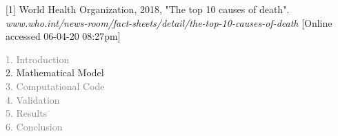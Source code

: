 \begin{frame}
\vspace{0.2cm}
\tiny [1] World Health Organization, 2018, "The top 10 causes of death".
\textit{www.who.int/news-room/fact-sheets/detail/the-top-10-causes-of-death}
[Online accessed 06-04-20 08:27pm]



\end{frame}



\begin{frame}
  \vspace{-1cm}
  \textcolor{gray}{1. Introduction}\\[0.1cm]
  2. Mathematical Model\\[0.1cm]
  \textcolor{gray}{3. Computational Code}\\[0.1cm]
  \textcolor{gray}{4. Validation}\\[0.1cm]
  \textcolor{gray}{5. Results}\\[0.1cm]
  \textcolor{gray}{6. Conclusion}
\end{frame}



